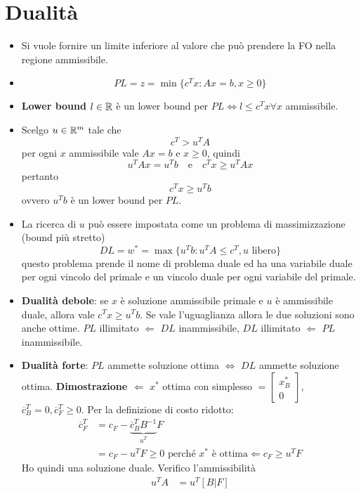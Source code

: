 \section{Dualità}

\begin{itemize}
	\item Si vuole fornire un limite inferiore al valore che può prendere la FO nella regione ammissibile.
	\item $$
	PL = z = \min\{  c^Tx : Ax = b, x\geq 0 \}
	$$
	\item \textbf{Lower bound} $l \in \mathbb{R}$ è un lower bound per $PL \Leftrightarrow l \leq c^Tx \forall x$ ammissibile.
	\item Scelgo $u \in \mathbb{R}^m$ tale che
	$$
	c^T > u^T A
	$$
	per ogni $x$ ammissibile vale $Ax=b$ e $x \geq 0$, quindi
	$$
	u^TA x = u^Tb \quad\text{e}\quad c^Tx \geq u^TAx
	$$
	pertanto
	$$
	c^Tx \geq u^Tb
	$$
	ovvero $u^Tb$ è un lower bound per $PL$.
	\item La ricerca di $u$ può essere impostata come un problema di massimizzazione (bound più stretto)
	$$
	DL = w^* = \max \{ u^Tb : u^TA \leq c^T, u \text{ libero} \}
	$$
	questo problema prende il nome di problema duale ed ha una variabile duale per ogni vincolo del primale e un vincolo duale per ogni variabile del primale.
	\item \textbf{Dualità debole}: se $x$ è soluzione ammissibile primale e $u$ è ammissibile duale, allora vale $c^Tx \geq u^{T}b$. Se vale l'uguaglianza allora le due soluzioni sono anche ottime. $PL$ illimitato $\Leftarrow$ $DL$ inammissibile, $DL$ illimitato $\Leftarrow$ $PL$ inammissibile.
	\item \textbf{Dualità forte}: $PL$ ammette soluzione ottima $\Leftrightarrow$ $DL$ ammette soluzione ottima. \textbf{Dimostrazione $\Leftarrow$} $x^*$ ottima con simplesso $= \begin{bmatrix}
	x^*_B \\
	0
	\end{bmatrix}$, $\overline{c}_{B}^T = 0,\overline{c}_{F}^T \geq 0$. Per la definizione di costo ridotto:
	\begin{align*}
	\overline{c}_{F}^T &= c_F - \underbrace{\overline{c}_{B}^TB^{-1}}_{u^T}F \\
					   &= c_F - u^T F \geq 0 \text{ perché $x^*$ è ottima} \Leftarrow c_F \geq u^TF
	\end{align*}
	Ho quindi una soluzione duale. Verifico l'ammissibilità
	\begin{align*}
		u^T A &= u^T[B|F] \\

\end{align*}
\end{itemize}
